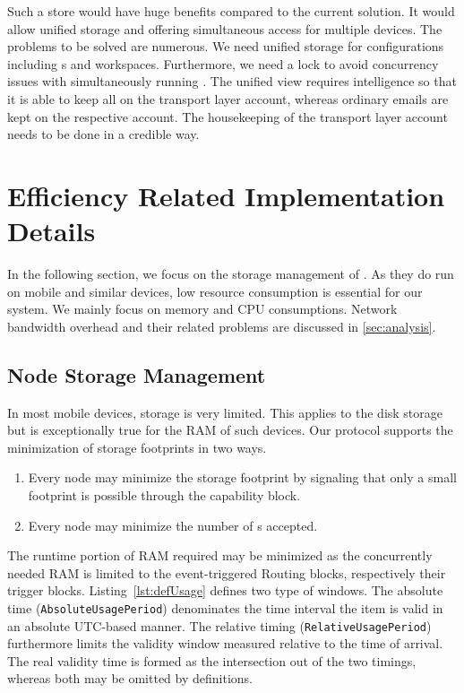 Such a store would have huge benefits compared to the current solution. It would allow unified storage and offering simultaneous access for multiple devices. The problems to be solved are numerous. We need unified storage for configurations including s and workspaces. Furthermore, we need a lock to avoid concurrency issues with simultaneously running \VortexNodes{}. The unified view requires intelligence so that it is able to keep all \VortexMessages{} on the transport layer account, whereas ordinary emails are kept on the respective account. The housekeeping of the transport layer account needs to be done in a credible way. 

\chapter{Efficiency Related Implementation Details}\label{sec:efficiencyImplementation}
In the following section, we focus on the storage management of \VortexNodes{}. As they do run on mobile and similar devices, low resource consumption is essential for our system. We mainly focus on memory and CPU consumptions. Network bandwidth overhead and their related problems are discussed in \cref{sec:analysis}.

\section{Node Storage Management}
In most mobile devices, storage is very limited. This applies to the disk storage but is exceptionally true for the RAM of such devices. Our protocol supports the minimization of storage footprints in two ways.
\begin{enumerate}
	\item Every node may minimize the storage footprint by signaling that only a small footprint is possible through the capability block.
	\item Every node may minimize the number of s accepted.
\end{enumerate}

The runtime portion of RAM required may be minimized as the concurrently needed RAM is limited to the event-triggered Routing blocks, respectively their trigger blocks. Listing~\ref{lst:defUsage} defines two type of windows. The absolute time (\texttt{AbsoluteUsagePeriod}) denominates the time interval the item is valid in an absolute UTC-based manner. The relative timing (\texttt{RelativeUsagePeriod}) furthermore limits the validity window measured relative to the time of arrival. The real validity time is formed as the intersection out of the two timings, whereas both may be omitted by definitions.

